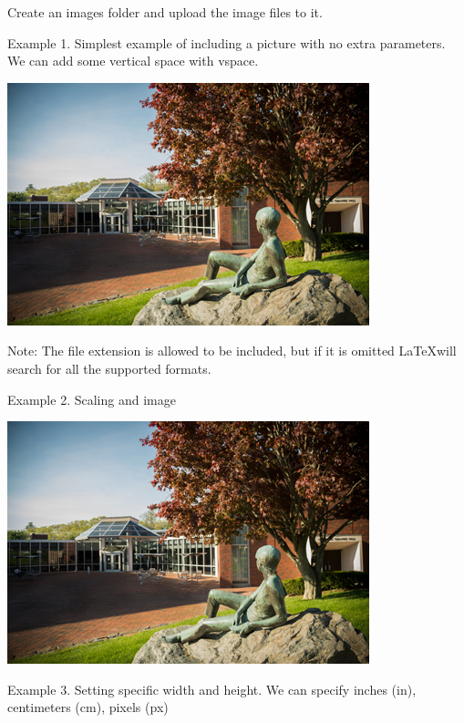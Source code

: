 \documentclass{article}
\begin{document}
Create an images folder and upload the image files to it.



Example 1.  Simplest example of including a picture with no extra parameters.
We can add some vertical space with vspace.
\vspace{1.5cm}

\includegraphics{library}

Note: The file extension is allowed to be included, but if it is omitted \LaTeX will search for all the supported formats.


\newpage

Example 2. Scaling and image

\includegraphics[scale=0.5]{library}

\vspace{1.5cm}


Example 3. Setting specific width and height. We can specify inches (in), centimeters (cm), pixels (px)
\end{document}
